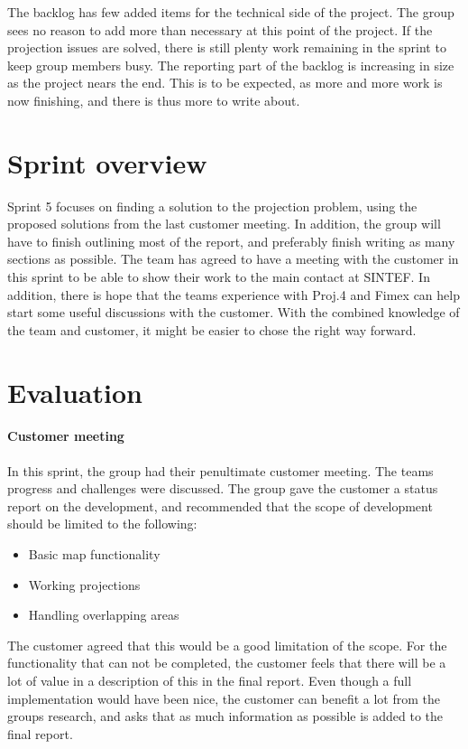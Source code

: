 \documentclass[11pt,a4paper,titlepage,oneside]{report}
\begin{document}
The backlog has few added items for the technical side of the project. The group sees no reason to add more than necessary at this point of the project. If the projection issues are solved, there is still plenty work remaining in the sprint to keep group members busy. The reporting part of the backlog is increasing in size as the project nears the end. This is to be expected, as more and more work is now finishing, and there is thus more to write about. 

\section{Sprint overview}
Sprint 5 focuses on finding a solution to the projection problem, using the proposed solutions from the last customer meeting. In addition, the group will have to finish outlining most of the report, and preferably finish writing as many sections as possible. The team has agreed to have a meeting with the customer in this sprint to be able to show their work to the main contact at SINTEF. In addition, there is hope that the teams experience with Proj.4 and \gls{Fimex} can help start some useful discussions with the customer. With the combined knowledge of the team and customer, it might be easier to chose the right way forward. 

\section{Evaluation}
\label{sec:Sprint5Evaluation}
\paragraph{Customer meeting}
In this sprint, the group had their penultimate customer meeting. The teams progress and challenges were discussed. The group gave the customer a status report on the development, and recommended that the scope of development should be limited to the following:

\begin{itemize}
\item Basic map functionality
\item Working projections
\item Handling overlapping areas
\end{itemize}

The customer agreed that this would be a good limitation of the scope. For the functionality that can not be completed, the customer feels that there will be a lot of value in a description of this in the final report. Even though a full implementation would have been nice, the customer can benefit a lot from the groups research, and asks that as much information as possible is added to the final report. 
\end{document}

